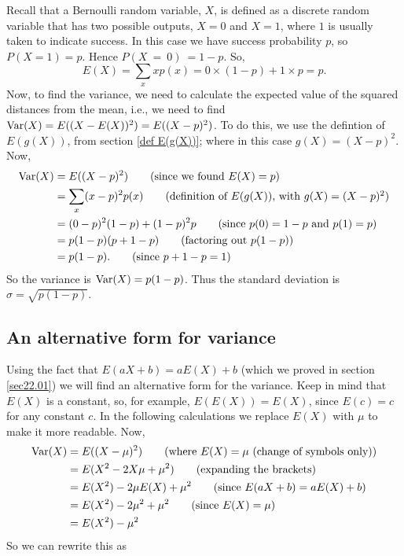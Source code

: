 \solution
Recall that a Bernoulli random variable, $X$, is defined as a discrete random variable that has two possible outputs, $X = 0$ and $X = 1$, where $1$ is usually taken to indicate success. In this case we have success probability $p$, so $P(X = 1) = p$. Hence $P(X~=~0)~= 1 - p$. So,
\[
E(X) = \sum_x xp(x) = 0\times(1-p) + 1\times p = p.
\]
Now, to find the variance, we need to calculate the expected value of the squared distances from the mean, i.e., we need to find $\text{Var}(X) = E((X - E(X))^2) = E((X - p)^2)$. To do this, we use the defintion of $E(g(X))$, from section \ref{def E(g(X))}; where in this case $g(X) = (X - p)^2$. Now,
\begin{align*}
\text{Var}(X)  & = E((X - p)^2) \tag{since we found $E(X) = p$} \\
	    & = \sum_x (x-p)^2p(x) \tag{definition of $E(g(X))$, with $g(X) = (X - p)^2$} \\
	    & = (0-p)^2(1-p) + (1-p)^2p \tag{since $p(0) = 1-p$ and $p(1) = p$} \\
	    & = p(1-p)(p+1-p) \tag{factoring out $p(1-p)$} \\
	    & = p(1-p). \tag{since $p+1-p = 1$}
\end{align*}
So the variance is $\text{Var}(X) = p(1-p)$. Thus the standard deviation is $\sigma = \sqrt{p(1-p)}$.

\subsection{An alternative form for variance} \label{alt form var}
Using the fact that $E(aX + b) = aE(X) + b$ (which we proved in section \ref{sec22.01}) we will find an alternative form for the variance. Keep in mind that $E(X)$ is a constant, so, for example, $E(E(X)) = E(X)$, since $E(c) = c$ for any constant $c$. In the following calculations we replace $E(X)$ with $\mu$ to make it more readable. Now,
\begin{align*}
\text{Var}(X) & = E((X - \mu)^2) \tag{where $E(X) = \mu$ (change of symbols only)} \\
	    & = E(X^2 - 2X\mu + \mu^2) \tag{expanding the brackets} \\
	    & =  E(X^2) - 2\mu E(X) + \mu^2 \tag{since $E(aX + b) = aE(X) + b$} \\
	    & =  E(X^2) - 2\mu^2 + \mu^2 \tag{since $E(X) = \mu$} \\
	    & = E(X^2) - \mu^2
\end{align*}
So we can rewrite this as

  	\bigskip
	

